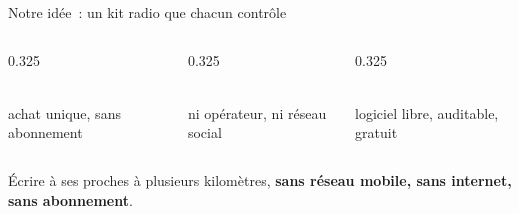 \begin{frame}{Notre idée~: un kit radio que chacun contrôle}
  \vspace{0.12cm}
  \begin{columns}[T]
    \begin{column}{0.325\textwidth}
      \begin{carte}\centering{}\\[1pt]{\footnotesize achat unique, sans abonnement}\end{carte}
    \end{column}
    \begin{column}{0.325\textwidth}
      \begin{carte}\centering{}\\[1pt]{\footnotesize ni opérateur, ni réseau social}\end{carte}
    \end{column}
    \begin{column}{0.325\textwidth}
      \begin{carte}\centering{}\\[1pt]{\footnotesize logiciel libre, auditable, gratuit}\end{carte}
    \end{column}
  \end{columns}
  \vspace{0.08cm}
  \begin{idee}\centering\footnotesize
    Écrire à ses proches à plusieurs kilomètres, \textbf{sans réseau mobile, sans internet, sans abonnement}.
  \end{idee}
\end{frame}

